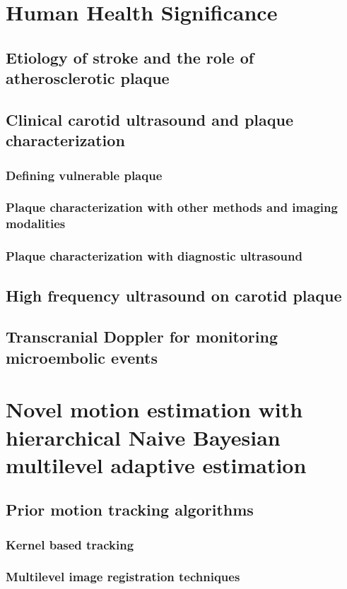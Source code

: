 \documentclass[12pt,twoside]{withesis}
\begin{document}
\tableofcontents


\chapter{Human Health Significance}

\section{Etiology of stroke and the role of atherosclerotic plaque}
\section{Clinical carotid ultrasound and plaque characterization}
\subsection{Defining vulnerable plaque}
\subsection{Plaque characterization with other methods and imaging modalities}
\subsection{Plaque characterization with diagnostic ultrasound}
\section{High frequency ultrasound on carotid plaque}
\section{Transcranial Doppler for monitoring microembolic events}


\chapter{Novel motion estimation with hierarchical Naive Bayesian multilevel
adaptive estimation}

\section{Prior motion tracking algorithms}
\subsection{Kernel based tracking}
\subsection{Multilevel image registration techniques}
\end{document}
